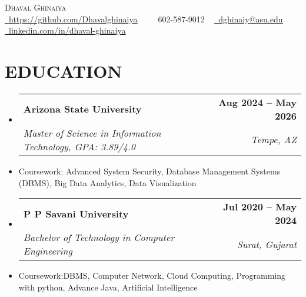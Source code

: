 \documentclass[letterpaper,11pt]{article}
\makeatletter
\newcommand{\resumeItem}[1]{
  \item\small{
    {#1 \vspace{-2pt}}
  }
}
\newcommand{\resumeSubheading}[4]{
  \vspace{-2pt}\item
    \begin{tabular*}{1.0\textwidth}[t]{l@{\extracolsep{\fill}}r}
      \textbf{#1} & \textbf{\small #2} \\
      \textit{\small#3} & \textit{\small #4} \\
    \end{tabular*}\vspace{-7pt}
}
\newcommand{\resumeSubHeadingListStart}{\begin{itemize}[leftmargin=0.0in, label={}]}
\newcommand{\resumeSubHeadingListEnd}{\end{itemize}}
\makeatother
\begin{document}

\begin{center}
    {\Huge \scshape Dhaval Ghinaiya} \\ \vspace{1pt}
    \href{https://github.com/Dhavalghinaiya}{\raisebox{-0.2\height}\faGithub\  \underline{https://github.com/Dhavalghinaiya}} ~  ~ \small \raisebox{-0.1\height}\faPhone {}\ 602-587-9012 ~ \href{mailto:x@gmail.com}{\raisebox{-0.2\height}\faEnvelope\  \underline{dghinaiy@asu.edu}} ~ 
    \href{https://linkedin.com/in//}{\raisebox{-0.2\height}\faLinkedin\ \underline{linkedin.com/in/dhaval-ghinaiya}}  ~
    \vspace{-10pt}
\end{center}


\section{EDUCATION}
  \resumeSubHeadingListStart
    \resumeSubheading
      {Arizona State University}{Aug 2024 -- May 2026}
      {Master of Science in Information Technology, GPA: 3.89/4.0}{Tempe, AZ}
            \resumeItem{Coursework: Advanced System Security, Database Management Systems (DBMS), Big Data Analytics, Data Visualization}
  \resumeSubHeadingListEnd
\vspace{-20pt}
  \resumeSubHeadingListStart
    \resumeSubheading
      {P P Savani University}{Jul 2020 -- May 2024}
      {Bachelor of Technology in Computer Engineering}{Surat, Gujarat}
      \resumeItem{Coursework:DBMS, Computer Network, Cloud Computing, Programming with python, Advance Java, Artificial Intelligence }
  \resumeSubHeadingListEnd
\vspace{-22pt}
\end{document}
